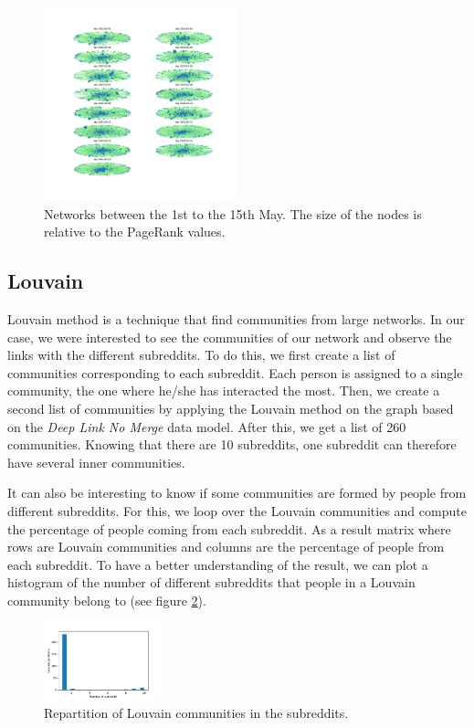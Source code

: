 \begin{figure}[H]
    \centering
    \includegraphics[width=0.5\textwidth]{figures/rank_days.pdf}
    \caption{Networks between the 1st to the 15th May. The size of the nodes is relative to the PageRank values.}
    \label{fig:rankdays}
\end{figure}

\subsection{Louvain}
Louvain method is a technique that find communities from large networks. In our case, we were interested to see the communities of our network and observe the links with the different subreddits. To do this, we first create a list of communities corresponding to each subreddit. Each person is assigned to a single community, the one where he/she has interacted the most. Then, we create a second list of communities by applying the Louvain method on the graph based on the \textit{Deep Link No Merge} data model.
After this, we get a list of 260 communities. Knowing that there are 10 subreddits, one subreddit can therefore have several inner communities. 

It can also be interesting to know if some communities are formed by people from different subreddits. For this, we loop over the Louvain communities and compute the percentage of people coming from each subreddit. As a result matrix where rows are Louvain communities and columns are the percentage of people from each subreddit. To have a better understanding of the result, we can plot a histogram of the number of different subreddits that people in a Louvain community belong to (see figure \ref{fig:louvainrepartition}).

\begin{figure}[H]
    \centering
    \includegraphics[width=0.3\textwidth]{figures/inner_communities_repartition.pdf}
    \caption{Repartition of Louvain communities in the subreddits.}
    \label{fig:louvainrepartition}
\end{figure}

